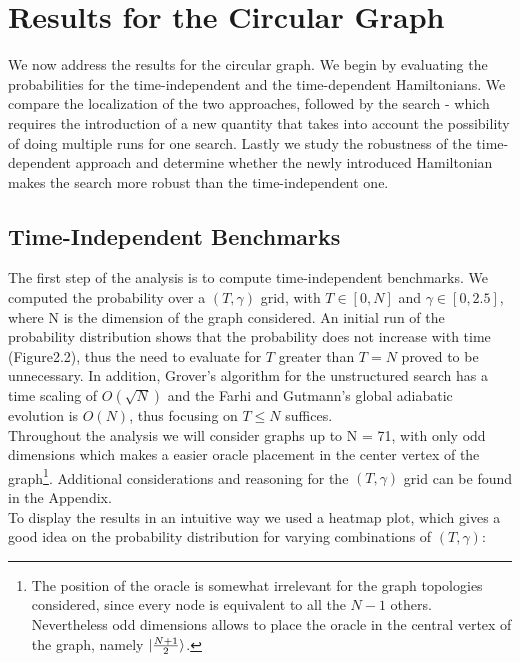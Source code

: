 \clearpage
\section{Results for the Circular Graph}
We now address the results for the circular graph. We begin by evaluating the probabilities for the time-independent and the time-dependent Hamiltonians. We compare the localization of the two approaches, followed by the search - which requires the introduction of a new quantity that takes into account the possibility of doing multiple runs for one search. Lastly we study the robustness of the time-dependent approach and determine whether the newly introduced Hamiltonian makes the search more robust than the time-independent one.
    \subsection{Time-Independent Benchmarks}
        The first step of the analysis is to compute time-independent benchmarks. We computed the probability over a $(T,\gamma)$ grid, with $T\in[0,N]$ and $\gamma\in[0,2.5]$, where N is the dimension of the graph considered. An initial run of the probability distribution shows that the probability does not increase with time (Figure2.2), thus the need to evaluate for $T$ greater than $T=N$ proved to be unnecessary. In addition, Grover's algorithm for the unstructured search has a time scaling of $O(\sqrt{N})$ and the Farhi and Gutmann's global adiabatic evolution is $O(N)$, thus focusing on $T \leq N$ suffices.\\
        

        \clearpage
        \noindent
        Throughout the analysis we will consider graphs up to N = 71, with only odd dimensions which makes a easier oracle placement in the center vertex of the graph\footnote{The position of the oracle is somewhat irrelevant for the graph topologies considered, since every node is equivalent to all the $N-1$ others. Nevertheless odd dimensions allows to place the oracle in the central vertex of the graph, namely ${|{\frac{N+1}{2}}\rangle}$.}. Additional considerations and reasoning for the $(T,\gamma)$ grid can be found in the Appendix. \\

        \noindent
        To display the results in an intuitive way we used a heatmap plot, which gives a good idea on the probability distribution for varying combinations of $(T,\gamma)$:
        

